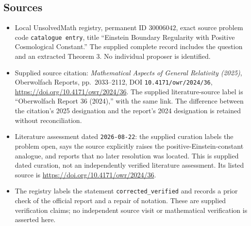 \documentclass[11pt]{article}
\begin{document}
\subsection{Sources}
\begin{itemize}
\item Local UnsolvedMath registry, permanent ID \(30006042\), exact source problem code \texttt{catalogue entry}, title ``Einstein Boundary Regularity with Positive Cosmological Constant.'' The supplied complete record includes the question and an extracted Theorem 3. No individual proposer is identified.
\item Supplied source citation: \emph{Mathematical Aspects of General Relativity (2025)}, Oberwolfach Reports, pp.\ 2033--2112, DOI \texttt{10.4171/owr/2024/36}, \url{https://doi.org/10.4171/owr/2024/36}. The supplied literature-source label is ``Oberwolfach Report 36 (2024),'' with the same link. The difference between the citation's 2025 designation and the report's 2024 designation is retained without reconciliation.
\item Literature assessment dated \texttt{2026-08-22}: the supplied curation labels the problem open, says the source explicitly raises the positive-Einstein-constant analogue, and reports that no later resolution was located. This is supplied dated curation, not an independently verified literature assessment. Its listed source is \url{https://doi.org/10.4171/owr/2024/36}.
\item The registry labels the statement \texttt{corrected\_verified} and records a prior check of the official report and a repair of notation. These are supplied verification claims; no independent source visit or mathematical verification is asserted here.
\end{itemize}
\end{document}
